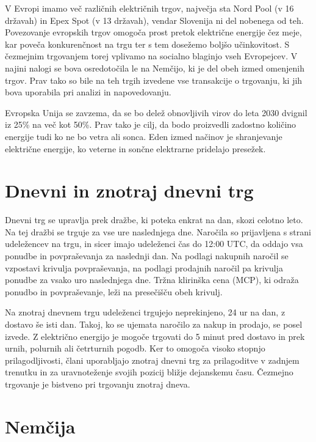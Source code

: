 \documentclass[12pt,a4paper]{amsart}
\theoremstyle{definition} %
\theoremstyle{plain} %
\begin{document}
V Evropi imamo več različnih električnih trgov, največja sta Nord Pool (v 16 državah) in Epex Spot (v 13 državah), vendar Slovenija ni del nobenega od teh. 
Povezovanje evropskih trgov omogoča prost pretok električne energije čez meje, kar poveča konkurenčnost na trgu ter s tem dosežemo boljšo učinkovitost. S čezmejnim trgovanjem torej vplivamo na socialno blaginjo vseh Evropejcev.
V najini nalogi se bova osredotočila le na Nemčijo, ki je del obeh izmed omenjenih trgov. Prav tako so bile na teh trgih izvedene vse transakcije o trgovanju, 
ki jih bova uporabila pri analizi in napovedovanju. 


Evropska Unija se zavzema, da se bo delež obnovljivih virov do leta 2030 dvignil iz 25\% na več kot 50\%. Prav tako je cilj, da bodo proizvedli zadostno količino energije tudi ko ne bo vetra ali sonca. 
Eden izmed načinov je shranjevanje električne energije, ko veterne in sončne elektrarne pridelajo presežek. 



\section{Dnevni in znotraj dnevni trg}

Dnevni trg se upravlja prek dražbe, ki poteka enkrat na dan, skozi celotno leto. Na tej dražbi se trguje za vse ure naslednjega dne. Naročila so prijavljena s strani udeležencev na trgu, 
in sicer imajo udeleženci čas do 12:00 UTC, da oddajo vsa ponudbe in povpraševanja za naslednji dan. Na podlagi nakupnih naročil se vzpostavi krivulja povpraševanja, na podlagi prodajnih naročil pa krivulja ponudbe za vsako uro naslednjega dne. Tržna klirinška cena (MCP), ki odraža ponudbo in povpraševanje, leži na presečišču obeh krivulj.


Na znotraj dnevnem trgu udeleženci trgujejo neprekinjeno, 24 ur na dan, z dostavo še isti dan. Takoj, ko se ujemata naročilo za nakup in prodajo, se posel izvede. Z električno energijo je mogoče trgovati do 5 minut pred dostavo in prek urnih, polurnih ali četrturnih pogodb. Ker to omogoča visoko stopnjo prilagodljivosti, člani uporabljajo znotraj dnevni trg za prilagoditve v zadnjem trenutku in za uravnoteženje svojih pozicij bližje dejanskemu času. Čezmejno trgovanje je bistveno pri trgovanju znotraj dneva. 


\section{Nemčija}
\end{document}
